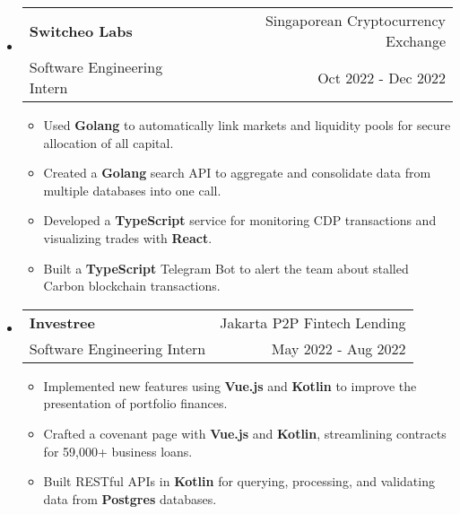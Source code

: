\documentclass[letterpaper, 11pt]{article}
\makeatletter
\newcommand{\ResumeEntryTSDL}[4]{
  \vspace{1pt}\item
    \begin{tabular*}{\textwidth}[t]{l@{\extracolsep{\fill}}r} 
      \textbf{#1} & #2 \\
      #3 & #4 \\
    \end{tabular*}\vspace{-2.835pt} %
}
\newcommand{\ResumeItem}[2]{
  \item{
    \textbf{#1}{: #2 \vspace{-2.835pt}}
  }
}
\newcommand{\ResumeItemDefault}[1]{
  \item{
    #1 \vspace{-2.835pt}
  }
}
\newcommand{\ResumeEntryStart}{\begin{itemize}[leftmargin=0mm, label={}]}
\newcommand{\ResumeEntryEnd}{\end{itemize}\vspace{-2.835pt}} %
\newcommand{\ResumeItemListStart}{\begin{itemize}[leftmargin=5mm, label=$\bullet$, itemsep=1mm, parsep=1mm]} %
\newcommand{\ResumeItemListEnd}{\end{itemize}}
\makeatother
\begin{document}
  \ResumeEntryStart
    \ResumeEntryTSDL{Switcheo Labs}{Singaporean Cryptocurrency Exchange}{Software Engineering Intern}{Oct 2022 - Dec 2022}
    \ResumeItemListStart
    \ResumeItemDefault{Used \textbf{Golang} to automatically link markets and liquidity pools for secure allocation of all capital.}
    \ResumeItemDefault{Created a \textbf{Golang} search API to aggregate and consolidate data from multiple databases into one call.}
    \ResumeItemDefault{Developed a \textbf{TypeScript} service for monitoring CDP transactions and visualizing trades with \textbf{React}.}
    \ResumeItemDefault{Built a \textbf{TypeScript} Telegram Bot to alert the team about stalled Carbon blockchain transactions.}
    \ResumeItemListEnd
  \ResumeEntryEnd

  \ResumeEntryStart
    \ResumeEntryTSDL{Investree}{Jakarta P2P Fintech Lending}{Software Engineering Intern}{May 2022 - Aug 2022}
    \ResumeItemListStart
      \ResumeItemDefault{Implemented new features using \textbf{Vue.js} and \textbf{Kotlin} to improve the presentation of portfolio finances.}
      \ResumeItemDefault{Crafted a covenant page with \textbf{Vue.js} and \textbf{Kotlin}, streamlining contracts for 59,000+ business loans.}
      \ResumeItemDefault{Built RESTful APIs in \textbf{Kotlin} for querying, processing, and validating data from \textbf{Postgres} databases.}
    \ResumeItemListEnd
  \ResumeEntryEnd
\end{document}
